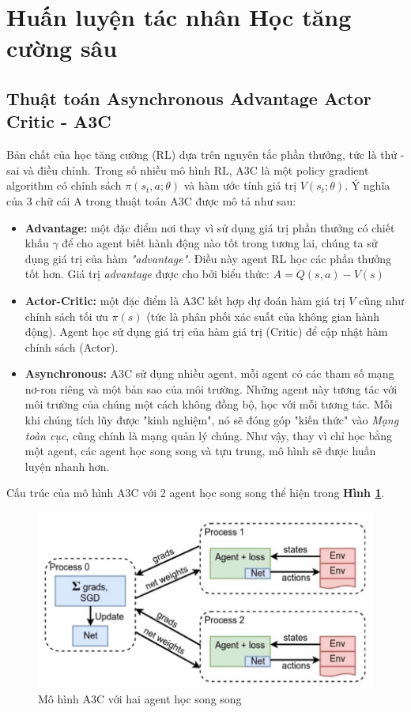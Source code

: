 \section{Huấn luyện tác nhân Học tăng cường sâu}

\subsection{Thuật toán Asynchronous Advantage Actor Critic - A3C}

Bản chất của học tăng cường (RL) dựa trên nguyên tắc phần thưởng, tức là thử - sai và điều chỉnh. Trong số nhiều mô hình RL, A3C là một policy gradient algorithm có chính sách $\pi(s_t,a;\theta)$ và hàm ước tính giá trị $V(s_t;\theta)$. Ý nghĩa của 3 chữ cái A trong thuật toán A3C \cite{mnih2016asynchronous} được mô tả như sau:

\begin{itemize}
    \item \textbf{Advantage:} một đặc điểm nơi thay vì sử dụng giá trị phần thưởng có chiết khấu $\gamma$ để cho agent biết hành động nào tốt trong tương lai, chúng ta sử dụng giá trị của hàm \textit{"advantage"}. Điều này agent RL học các phần thưởng tốt hơn. Giá trị \textit{advantage} được cho bởi biểu thức: $A = Q(s,a) - V(s)$
    \item \textbf{Actor-Critic:} một đặc điểm là A3C kết hợp dự đoán hàm giá trị $V$ cũng như chính sách tối ưu $\pi(s)$ (tức là phân phối xác suất của không gian hành động). Agent học sử dụng giá trị của hàm giá trị (Critic) để cập nhật hàm chính sách (Actor). 
    \item \textbf{Asynchronous:} A3C sử dụng nhiều agent, mỗi agent có các tham số mạng nơ-ron riêng và một bản sao của môi trường. Những agent này tương tác với môi trường của chúng một cách không đồng bộ, học với mỗi tương tác. Mỗi khi chúng tích lũy được "kinh nghiệm", nó sẽ đóng góp "kiến thức" vào \textit{Mạng toàn cục}, cũng chính là mạng quản lý chúng. Như vậy, thay vì chỉ học bằng một agent, các agent học song song và tựu trung, mô hình sẽ được huấn luyện nhanh hơn.
\end{itemize}

Cấu trúc của mô hình A3C với 2 agent học song song thể hiện trong \textbf{Hình \ref{fig:chap3-a3cParallel}}.

\begin{figure}[!h]
    \centering
    \includegraphics[scale=0.8]{graphics/chapter-3/chap3-a3cParallel.PNG}
    \caption{Mô hình A3C với hai agent học song song}
    \label{fig:chap3-a3cParallel}
\end{figure}


